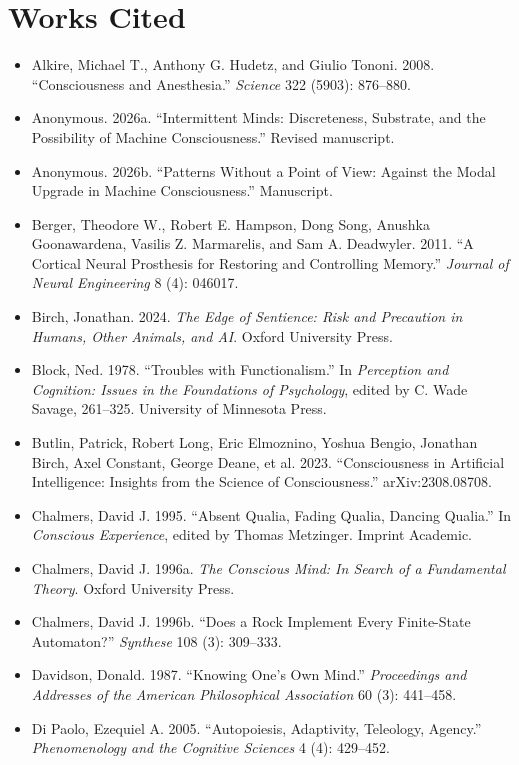 \documentclass[11pt]{article}
\begin{document}
\section*{Works Cited}
\begin{itemize}[leftmargin=2em, itemsep=2pt, label={}]
\itemsep0.35em
\item Alkire, Michael T., Anthony G. Hudetz, and Giulio Tononi. 2008. ``Consciousness and Anesthesia.'' \emph{Science} 322 (5903): 876--880.
\item Anonymous. 2026a. ``Intermittent Minds: Discreteness, Substrate, and the Possibility of Machine Consciousness.'' Revised manuscript.
\item Anonymous. 2026b. ``Patterns Without a Point of View: Against the Modal Upgrade in Machine Consciousness.'' Manuscript.
\item Berger, Theodore W., Robert E. Hampson, Dong Song, Anushka Goonawardena, Vasilis Z. Marmarelis, and Sam A. Deadwyler. 2011. ``A Cortical Neural Prosthesis for Restoring and Controlling Memory.'' \emph{Journal of Neural Engineering} 8 (4): 046017.
\item Birch, Jonathan. 2024. \emph{The Edge of Sentience: Risk and Precaution in Humans, Other Animals, and AI}. Oxford University Press.
\item Block, Ned. 1978. ``Troubles with Functionalism.'' In \emph{Perception and Cognition: Issues in the Foundations of Psychology}, edited by C. Wade Savage, 261--325. University of Minnesota Press.
\item Butlin, Patrick, Robert Long, Eric Elmoznino, Yoshua Bengio, Jonathan Birch, Axel Constant, George Deane, et al. 2023. ``Consciousness in Artificial Intelligence: Insights from the Science of Consciousness.'' arXiv:2308.08708.
\item Chalmers, David J. 1995. ``Absent Qualia, Fading Qualia, Dancing Qualia.'' In \emph{Conscious Experience}, edited by Thomas Metzinger. Imprint Academic.
\item Chalmers, David J. 1996a. \emph{The Conscious Mind: In Search of a Fundamental Theory}. Oxford University Press.
\item Chalmers, David J. 1996b. ``Does a Rock Implement Every Finite-State Automaton?'' \emph{Synthese} 108 (3): 309--333.
\item Davidson, Donald. 1987. ``Knowing One's Own Mind.'' \emph{Proceedings and Addresses of the American Philosophical Association} 60 (3): 441--458.
\item Di Paolo, Ezequiel A. 2005. ``Autopoiesis, Adaptivity, Teleology, Agency.'' \emph{Phenomenology and the Cognitive Sciences} 4 (4): 429--452.

\end{itemize}
\end{document}
